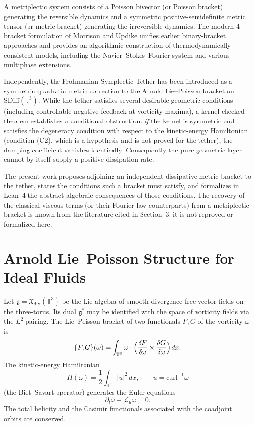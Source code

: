 \documentclass[11pt,a4paper]{article}
\begin{document}
A metriplectic system consists of a Poisson bivector (or Poisson bracket) generating the reversible dynamics and a symmetric positive-semidefinite metric tensor (or metric bracket) generating the irreversible dynamics. The modern 4-bracket formulation of Morrison and Updike unifies earlier binary-bracket approaches and provides an algorithmic construction of thermodynamically consistent models, including the Navier--Stokes--Fourier system and various multiphase extensions.

Independently, the Frohmanian Symplectic Tether has been introduced as a symmetric quadratic metric correction to the Arnold Lie--Poisson bracket on \(\mathrm{SDiff}(\mathbb{T}^3)\). While the tether satisfies several desirable geometric conditions (including controllable negative feedback at vorticity maxima), a kernel-checked theorem establishes a conditional obstruction: \emph{if} the kernel is symmetric and satisfies the degeneracy condition with respect to the kinetic-energy Hamiltonian (condition (C2), which is a hypothesis and is not proved for the tether), the damping coefficient vanishes identically. Consequently the pure geometric layer cannot by itself supply a positive dissipation rate.

The present work proposes adjoining an independent dissipative metric bracket to the tether, states the conditions such a bracket must satisfy, and formalizes in Lean~4 the abstract algebraic consequences of those conditions. The recovery of the classical viscous terms (or their Fourier-law counterparts) from a metriplectic bracket is known from the literature cited in Section~3; it is not reproved or formalized here.

\section{Arnold Lie--Poisson Structure for Ideal Fluids}
Let \(\mathfrak{g} = \mathfrak{X}_{\mathrm{div}}(\mathbb{T}^3)\) be the Lie algebra of smooth divergence-free vector fields on the three-torus. Its dual \(\mathfrak{g}^*\) may be identified with the space of vorticity fields via the \(L^2\) pairing. The Lie--Poisson bracket of two functionals \(F,G\) of the vorticity \(\omega\) is
\begin{equation}
\{F,G\}(\omega) = \int_{\mathbb{T}^3} \omega \cdot \Bigl(
\frac{\delta F}{\delta\omega}\times\frac{\delta G}{\delta\omega}\Bigr)\,dx.
\end{equation}
The kinetic-energy Hamiltonian
\begin{equation}
H(\omega) = \frac12\int_{\mathbb{T}^3}|u|^2\,dx,\qquad
u = \mathrm{curl}^{-1}\omega
\end{equation}
(the Biot--Savart operator) generates the Euler equations
\begin{equation}
\partial_t\omega + \mathcal{L}_u\omega = 0.
\end{equation}
The total helicity and the Casimir functionals associated with the coadjoint orbits are conserved.
\end{document}
